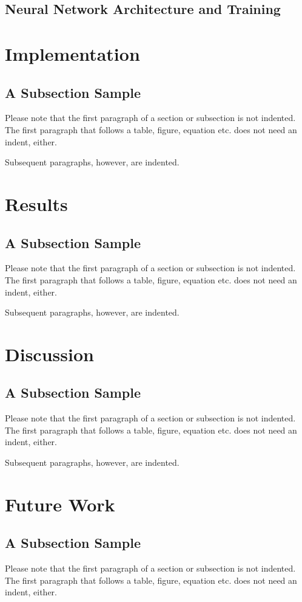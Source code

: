 \documentclass[runningheads]{llncs}
\begin{document}
\subsection{Neural Network Architecture and Training}

\section{Implementation}
\subsection{A Subsection Sample}
Please note that the first paragraph of a section or subsection is
not indented. The first paragraph that follows a table, figure,
equation etc. does not need an indent, either.

Subsequent paragraphs, however, are indented.

\section{Results}
\subsection{A Subsection Sample}
Please note that the first paragraph of a section or subsection is
not indented. The first paragraph that follows a table, figure,
equation etc. does not need an indent, either.

Subsequent paragraphs, however, are indented.

\section{Discussion}
\subsection{A Subsection Sample}
Please note that the first paragraph of a section or subsection is
not indented. The first paragraph that follows a table, figure,
equation etc. does not need an indent, either.

Subsequent paragraphs, however, are indented.

\section{Future Work}
\subsection{A Subsection Sample}
Please note that the first paragraph of a section or subsection is
not indented. The first paragraph that follows a table, figure,
equation etc. does not need an indent, either.
\end{document}
